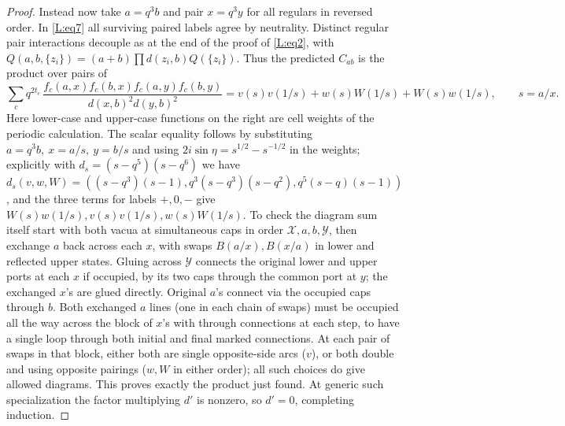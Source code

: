 \begin{proof}
Instead now take \(a=q^3b\) and pair \(x=q^3y\) for all regulars in reversed order. In \eqref{L:eq7} all surviving paired labels agree by neutrality. Distinct regular pair interactions decouple as at the end of the proof of \eqref{L:eq2}, with \(Q(a,b,\{z_i\})=(a+b)\prod d(z_i,b)Q(\{z_i\})\). Thus the predicted \(C_{ab}\) is the product over pairs of
\[
 \sum_c q^{2t_c}\,
 \frac{ f_c(a,x) f_c(b,x) f_c(a,y) f_c(b,y)}
 {d(x,b)^2d(y,b)^2}
 =
 v(s)v(1/s)+w(s)W(1/s)+W(s)w(1/s),\qquad s=a/x .
\]
Here lower-case and upper-case functions on the right are cell weights of the periodic calculation. The scalar equality follows by substituting \(a=q^3 b,\ x=a/s,\ y=b/s\) and using \(2i\sin\eta=s^{1/2}-s^{-1/2}\) in the weights; explicitly with \(d_s=(s-q^5)(s-q^6)\) we have \(d_s(v,w,W)=((s-q^3)(s-1),q^3(s-q^3)(s-q^2),q^5(s-q)(s-1))\), and the three terms for labels \(+,0,-\) give \(W(s)w(1/s), v(s)v(1/s), w(s)W(1/s)\). To check the diagram sum itself start with both vacua at simultaneous caps in order \(\mathcal X,a,b,\mathcal Y\), then exchange \(a\) back across each \(x\), with swaps \(B(a/x),B(x/a)\) in lower and reflected upper states. Gluing across \(\mathcal Y\) connects the original lower and upper ports at each \(x\) if occupied, by its two caps through the common port at \(y\); the exchanged \(x\)'s are glued directly. Original \(a\)'s connect via the occupied caps through \(b\). Both exchanged \(a\) lines (one in each chain of swaps) must be occupied all the way across the block of \(x\)'s with through connections at each step, to have a single loop through both initial and final marked connections. At each pair of swaps in that block, either both are single opposite-side arcs (\(v\)), or both double and using opposite pairings (\(w,W\) in either order); all such choices do give allowed diagrams. This proves exactly the product just found. At generic such specialization the factor multiplying \(d'\) is nonzero, so \(d'=0\), completing induction.
\end{proof}
